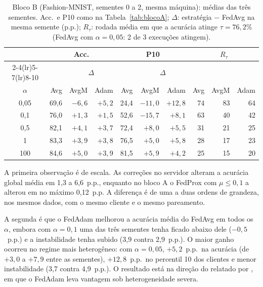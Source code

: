 \begin{table}[ht]
    \centering\small
    \caption{Bloco B (Fashion-MNIST, sementes 0 a 2, mesma máquina): médias das três sementes. Acc.\ e P10 como na Tabela~\ref{tab:blocoA}; $\Delta$: estratégia $-$ FedAvg na mesma semente (p.p.); $R_\tau$: rodada média em que a acurácia atinge $\tau = 76{,}2\%$ (FedAvg com $\alpha = 0{,}05$: 2 de 3 execuções atingem).}
    \label{tab:blocoB}
    \setlength{\tabcolsep}{2.2pt}
    \begin{tabular}{@{}crrrrrrrrr@{}}
        \toprule
        & \multicolumn{3}{c}{Acc.} & \multicolumn{3}{c}{P10} & \multicolumn{3}{c}{$R_\tau$} \\
        \cmidrule(lr){2-4}\cmidrule(lr){5-7}\cmidrule(lr){8-10}
        & & \multicolumn{2}{c}{$\Delta$} & & \multicolumn{2}{c}{$\Delta$} & & & \\
        $\alpha$ & Avg & AvgM & Adam & Avg & AvgM & Adam & Avg & AvgM & Adam \\
        \midrule
        0,05 & 69{,}6 & $-6{,}6$ & $+5{,}2$ & 24{,}4 & $-11{,}0$ & $+12{,}8$ & 74 & 83 & 64 \\
        0,1  & 76{,}0 & $+1{,}3$ & $+1{,}5$ & 52{,}6 & $-15{,}7$ & $+8{,}1$  & 63 & 40 & 42 \\
        0,5  & 82{,}1 & $+4{,}1$ & $+3{,}7$ & 72{,}4 & $+8{,}0$  & $+5{,}5$  & 31 & 21 & 25 \\
        1    & 83{,}3 & $+3{,}9$ & $+3{,}8$ & 76{,}5 & $+5{,}0$  & $+5{,}8$  & 28 & 17 & 23 \\
        100  & 84{,}6 & $+5{,}0$ & $+3{,}9$ & 81{,}5 & $+5{,}9$  & $+4{,}2$  & 25 & 15 & 20 \\
        \bottomrule
    \end{tabular}
\end{table}

A primeira observação é de escala. As correções no servidor alteram a acurácia global média em 1,3 a 6,6~p.p., enquanto no bloco A o FedProx com $\mu \leq 0{,}1$ a alterou em no máximo 0,12~p.p. A diferença é de uma a duas ordens de grandeza, nos mesmos dados, com o mesmo cliente e o mesmo pareamento.

A segunda é que o FedAdam melhorou a acurácia média do FedAvg em todos os $\alpha$, embora com $\alpha = 0{,}1$ uma das três sementes tenha ficado abaixo dele ($-0{,}5$~p.p.) e a instabilidade tenha subido (3,9 contra 2,9~p.p.). O maior ganho ocorreu no regime mais heterogêneo: com $\alpha = 0{,}05$, $+5{,}2$~p.p.\ na acurácia (de $+3{,}0$ a $+7{,}9$ entre as sementes), $+12{,}8$~p.p.\ no percentil 10 dos clientes e menor instabilidade (3,7 contra 4,9~p.p.). O resultado está na direção do relatado por \citet{enang2026optimiser}, em que o FedAdam leva vantagem sob heterogeneidade severa.


